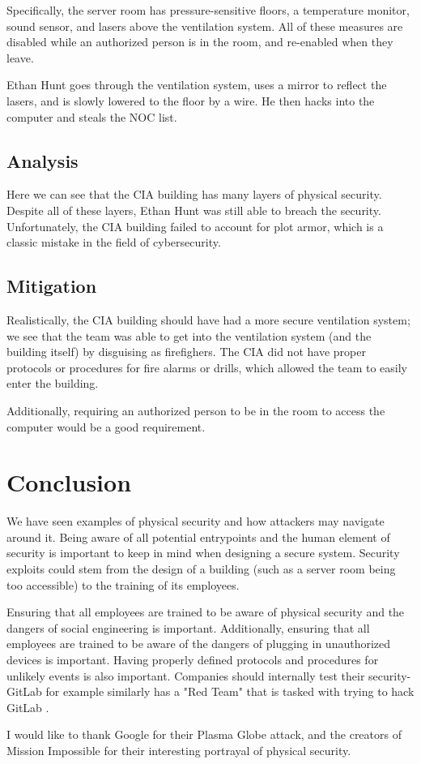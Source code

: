 \documentclass[acmsmall]{acmart}
\begin{document}
Specifically, the server room has pressure-sensitive floors, a temperature monitor,
sound sensor, and lasers above the ventilation system. All of these measures are disabled
while an authorized person is in the room, and re-enabled when they leave.

Ethan Hunt goes through the ventilation system, uses a mirror to reflect the
lasers, and is slowly lowered to the floor by a wire. He then hacks into the
computer and steals the NOC list.

\subsection{Analysis}
Here we can see that the CIA building has many layers of physical security.
Despite all of these layers, Ethan Hunt was still able to breach the security.
Unfortunately, the CIA building failed to account for plot armor, which is
a classic mistake in the field of cybersecurity.

\subsection{Mitigation}
Realistically, the CIA building should have had a more secure ventilation system;
we see that the team was able to get into the ventilation system (and the building itself)
by disguising as firefighers. The CIA did not have proper protocols or procedures
for fire alarms or drills, which allowed the team to easily enter the building.

Additionally, requiring an authorized person to be in the room to access the
computer would be a good requirement.

\section{Conclusion}
We have seen examples of physical security and how attackers may navigate around
it. Being aware of all potential entrypoints and the human element of security is important
to keep in mind when designing a secure system. Security exploits could stem from the
design of a building (such as a server room being too accessible) to the training of
its employees.

Ensuring that all employees are trained to be aware of physical security and the dangers
of social engineering is important. Additionally, ensuring that all employees are trained
to be aware of the dangers of plugging in unauthorized devices is important. Having properly
defined protocols and procedures for unlikely events is also important.
Companies should internally test their security- GitLab for example similarly has a
"Red Team" that is tasked with trying to hack GitLab \cite{GitLab}.

\begin{acks}
  I would like to thank Google for their Plasma Globe attack, and the creators of
  Mission Impossible for their interesting portrayal of physical security.
\end{acks}



\end{document}
